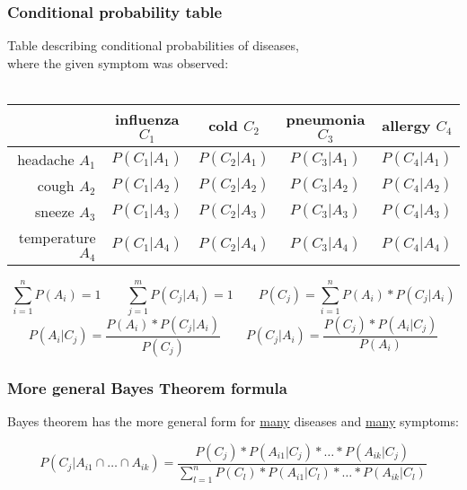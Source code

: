 \documentclass[proffesionalfonts]{beamer}
\newcommand{\un}[1]{\underline{#1}}
\begin{document}
\begin{frame}\frametitle{Conditional probability table}
\begin{center}
\small
Table describing conditional probabilities of diseases, \\
where the given symptom was observed:\\ 
\ \\
   \begin{tabular}{||r||c|c|c|c||}
   \hline \hline
    & influenza $C_1$ & cold $C_2$ & pneumonia $C_3$ & allergy  $C_4$ \\
   \hline
   headache $A_1$ & $P(C_1|A_1)$ & $P(C_2|A_1)$ & $P(C_3|A_1)$ & $P(C_4|A_1)$  \\
   \hline
   cough $A_2$ & $P(C_1|A_2)$ & $P(C_2|A_2)$ & $P(C_3|A_2)$ & $P(C_4|A_2)$  \\
   \hline
   sneeze $A_3$  & $P(C_1|A_3)$ & $P(C_2|A_3)$ & $P(C_3|A_3)$ & $P(C_4|A_3)$  \\
   \hline
   temperature $A_4$ & $P(C_1|A_4)$ & $P(C_2|A_4)$ & $P(C_3|A_4)$ & $P(C_4|A_4)$  \\
   \hline \hline
   \end{tabular}
\[\sum_{i=1}^{n}P(A_i)=1\qquad \sum_{j=1}^{m}P(C_j|A_i)=1\qquad P(C_j)=\sum_{i=1}^{n}P(A_i)*P(C_j|A_i)\]
\[P(A_i|C_j)=\frac{P(A_i)*P(C_j|A_i)}{P(C_j)}\qquad P(C_j|A_i)=\frac{P(C_j)*P(A_i|C_j)}{P(A_i)}\]
\normalsize
\end{center}
\end{frame}

\begin{frame}\frametitle{More general Bayes Theorem formula}
Bayes theorem has the more general form for \un{many} diseases and \un{many} symptoms:
\begin{center}
\large
\[P(C_j|A_{i1}\cap\ldots\cap A_{ik})=\frac{P(C_j)*P(A_{i1}|C_j)*\ldots *P(A_{ik}|C_j)}{\displaystyle\sum_{l=1}^{n}P(C_l)*P(A_{i1}|C_l)*\ldots *P(A_{ik}|C_l)}\]
\normalsize
\end{center}
\end{frame}
\end{document}
